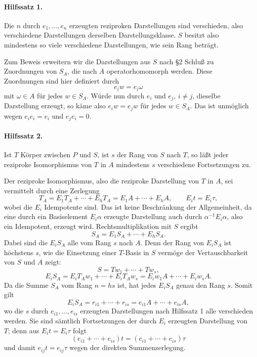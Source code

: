 \documentclass[11pt]{article}
\begin{document}
\paragraph{Hilfssatz 1.}
Die \(n\) durch \(e_1,\ldots,e_n\) erzeugten reziproken Darstellungen sind verschieden, also verschiedene Darstellungen derselben Darstellungsklasse. \(S\) besitzt also mindestens so viele verschiedene Darstellungen, wie sein Rang beträgt.

Zum Beweis erweitern wir die Darstellungen aus \(S\) nach §2 Schluß zu Zuordnungen von \(S_A\), die nach \(A\) operatorhomomorph werden. Diese Zuordnungen sind hier definiert durch
\[
        e_i w=e_i\omega
\]
mit \(\omega\in A\) für jedes \(w\in S_A\). Würde nun durch \(e_i\) und \(e_j\), \(i\ne j\), dieselbe Darstellung erzeugt, so käme also \(e_iw=e_jw\) für jedes \(w\in S_A\). Das ist unmöglich wegen \(e_ie_i=e_i\) und \(e_je_i=0\).

\paragraph{Hilfssatz 2.}
Ist \(T\) Körper zwischen \(P\) und \(S\), ist \(s\) der Rang von \(S\) nach \(T\), so läßt jeder reziproke Isomorphismus von \(T\) in \(A\) mindestens \(s\) verschiedene Fortsetzungen zu.

Der reziproke Isomorphismus, also die reziproke Darstellung von \(T\) in \(A\), sei vermittelt durch eine Zerlegung
\[
        T_A=E_1T_A+\cdots+E_hT_A
            =E_1A+\cdots+E_hA,
        \qquad E_it=E_i\tau ,
\]
wobei die \(E_i\) Idempotente sind. Das ist keine Beschränkung der Allgemeinheit, da eine durch ein Basiselement \(E_i\alpha\) erzeugte Darstellung auch durch \(\alpha^{-1}E_i\alpha\), also ein Idempotent, erzeugt wird. Rechtsmultiplikation mit \(S\) ergibt
\[
        S_A=E_1S_A+\cdots+E_hS_A .
\]
Dabei sind die \(E_iS_A\) alle vom Rang \(s\) nach \(A\). Denn der Rang von \(E_iS_A\) ist höchstens \(s\), wie die Einsetzung einer \(T\)-Basis in \(S\) vermöge der Vertauschbarkeit von \(S\) und \(A\) zeigt:
\[
        S=Tw_1+\cdots+Tw_s,
\]
\[
        E_iS_A=E_iT_Aw_1+\cdots+E_iT_Aw_s
              =E_iw_1A+\cdots+E_iw_sA .
\]
Da die Summe \(S_A\) vom Rang \(n=hs\) ist, hat jedes \(E_iS_A\) genau den Rang \(s\). Somit gilt
\[
        E_iS_A=r_{i1}+\cdots+r_{is}
              =e_{i1}A+\cdots+e_{is}A,
\]
wo die \(s\) durch \(e_{i1},\ldots,e_{is}\) erzeugten Darstellungen nach Hilfssatz 1 alle verschieden werden. Sie sind sämtlich Fortsetzungen der durch \(E_i\) erzeugten Darstellung von \(T\); denn aus \(E_it=E_i\tau\) folgt
\[
        (e_{i1}+\cdots+e_{is})t=(e_{i1}+\cdots+e_{is})\tau
\]
und damit \(e_{ij}t=e_{ij}\tau\) wegen der direkten Summenzerlegung.
\end{document}
